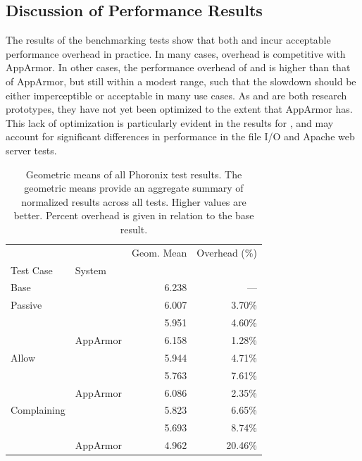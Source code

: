 \subsection{Discussion of Performance Results}%
\label{ss:eval-performance-discussion}

The results of the benchmarking tests show that both \bpfbox{} and \bpfcontain{} incur
acceptable performance overhead in practice. In many cases, overhead is competitive with
AppArmor. In other cases, the performance overhead of \bpfbox{} and \bpfcontain{} is
higher than that of AppArmor, but still within a modest range, such that the slowdown
should be either imperceptible or acceptable in many use cases.  As \bpfbox{}
and \bpfcontain{} are both research prototypes, they have not yet been optimized to the
extent that AppArmor has. This lack of optimization is particularly evident in the results
for \bpfcontain{}, and may account for significant differences in performance in the file
I/O and Apache web server tests.

\begin{table}[ht]
  \centering
  \footnotesize
  \caption[Geometric means of Phoronix benchmarking results]{
    Geometric means of all Phoronix test results. The geometric means provide an aggregate
    summary of normalized results across all tests. Higher values are better. Percent
    overhead is given in relation to the base result.
  }%
  \label{tab:phoronix-geometric}
  \begin{tabular}{llrr}
  \toprule
             &               & Geom. Mean & Overhead (\%)\\
   Test Case & System        &            &              \\
   \midrule
   Base      &               & 6.238          & --- \\
   \cline{1-4}
   Passive   & \bpfbox{}     & 6.007          & 3.70\% \\
             & \bpfcontain{} & 5.951          & 4.60\% \\
             & AppArmor      & 6.158          & 1.28\% \\
   \cline{1-4}
   Allow     & \bpfbox{}     & 5.944          & 4.71\% \\
             & \bpfcontain{} & 5.763          & 7.61\% \\
             & AppArmor      & 6.086          & 2.35\% \\
   \cline{1-4}
   Complaining  & \bpfbox{}  & 5.823          & 6.65\% \\
             & \bpfcontain{} & 5.693          & 8.74\% \\
             & AppArmor      & 4.962          & 20.46\% \\
  \bottomrule
  \end{tabular}
\end{table}

